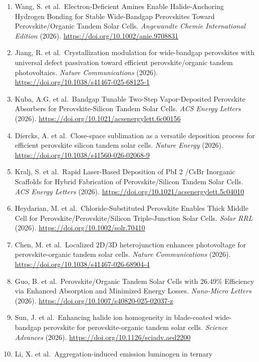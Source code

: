 \documentclass[
  11pt,
]{article}
\begin{document}
\begin{enumerate}
  \url{https://doi.org/10.1007/s40820-025-01959-y}
\item
  Wang, S. et al.~Electron‐Deficient Amines Enable Halide‐Anchoring
  Hydrogen Bonding for Stable Wide‐Bandgap Perovskites Toward
  Perovskite/Organic Tandem Solar Cells. \emph{Angewandte Chemie
  International Edition} (2026).
  \url{https://doi.org/10.1002/anie.9708831}
\item
  Jiang, R. et al.~Crystallization modulation for wide-bandgap
  perovskites with universal defect passivation toward efficient
  perovskite/organic tandem photovoltaics. \emph{Nature Communications}
  (2026). \url{https://doi.org/10.1038/s41467-025-68125-1}
\item
  Kuba, A.G. et al.~Bandgap Tunable Two-Step Vapor-Deposited Perovskite
  Absorbers for Perovskite-Silicon Tandem Solar Cells. \emph{ACS Energy
  Letters} (2026). \url{https://doi.org/10.1021/acsenergylett.6c00156}
\item
  Diercks, A. et al.~Close-space sublimation as a versatile deposition
  process for efficient perovskite silicon tandem solar cells.
  \emph{Nature Energy} (2026).
  \url{https://doi.org/10.1038/s41560-026-02068-9}
\item
  Kralj, S. et al.~Rapid Laser-Based Deposition of PbI 2 /CsBr Inorganic
  Scaffolds for Hybrid Fabrication of Perovskite/Silicon Tandem Solar
  Cells. \emph{ACS Energy Letters} (2026).
  \url{https://doi.org/10.1021/acsenergylett.5c04010}
\item
  Heydarian, M. et al.~Chloride‐Substituted Perovskite Enables Thick
  Middle Cell for Perovskite/Perovskite/Silicon Triple‐Junction Solar
  Cells. \emph{Solar RRL} (2026).
  \url{https://doi.org/10.1002/solr.70410}
\item
  Chen, M. et al.~Localized 2D/3D heterojunction enhances photovoltage
  for perovskite-organic tandem solar cells. \emph{Nature
  Communications} (2026).
  \url{https://doi.org/10.1038/s41467-026-68904-4}
\item
  Guo, B. et al.~Perovskite/Organic Tandem Solar Cells with 26.49\%
  Efficiency via Enhanced Absorption and Minimized Energy Losses.
  \emph{Nano-Micro Letters} (2026).
  \url{https://doi.org/10.1007/s40820-025-02037-z}
\item
  Sun, J. et al.~Enhancing halide ion homogeneity in blade-coated
  wide-bandgap perovskite for perovskite-organic tandem solar cells.
  \emph{Science Advances} (2026).
  \url{https://doi.org/10.1126/sciadv.aed2200}
\item
  Li, X. et al.~Aggregation-induced emission luminogen in ternary

\end{enumerate}
\end{document}

